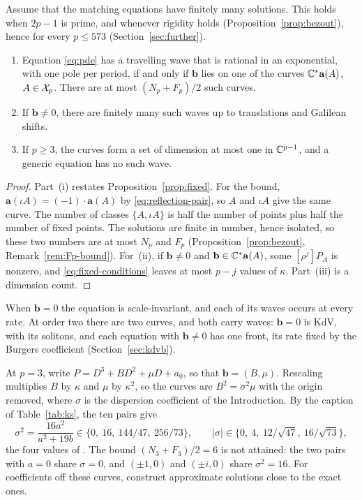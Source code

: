 \begin{corollary}\label{cor:solvable}
Assume that the matching equations have finitely many solutions. This
holds when \(2p-1\) is prime, and whenever rigidity holds
(Proposition~\ref{prop:bezout}), hence for every \(p\le573\)
(Section~\ref{sec:further}).
\begin{enumerate}
\item[\textup{(i)}] Equation \eqref{eq:pde} has a travelling wave that
is rational in an exponential, with one pole per period, if and only if
\(\mathbf b\) lies on one of the curves \(\mathbb C^\ast\mathbf a(A)\),
\(A\in\mathcal X_p\). There are at most \((N_p+F_p)/2\) such curves.
\item[\textup{(ii)}] If \(\mathbf b\ne0\), there are finitely many such
waves up to translations and Galilean shifts.
\item[\textup{(iii)}] If \(p\ge3\), the curves form a set of dimension
at most one in \(\mathbb C^{p-1}\), and a generic equation has no such wave.
\end{enumerate}
\end{corollary}

\begin{proof}
Part~(i) restates Proposition~\ref{prop:fixed}. For the bound,
\(\mathbf a(\iota A)=(-1)\cdot\mathbf a(A)\) by
\eqref{eq:reflection-pair}, so \(A\) and \(\iota A\) give the same
curve. The number of classes \(\{A,\iota A\}\) is half the number of
points plus half the number of fixed points. The solutions are finite in
number, hence isolated, so these two numbers are at most \(N_p\) and
\(F_p\) (Proposition~\ref{prop:bezout}, Remark~\ref{rem:Fp-bound}).
For~(ii), if \(\mathbf b\ne0\) and \(\mathbf b\in\mathbb C^\ast\mathbf a(A)\),
some \([\rho^j]P_A\) is nonzero, and \eqref{eq:fixed-conditions} leaves
at most \(p-j\) values of \(\kappa\). Part~(iii) is a dimension count.
\end{proof}

When \(\mathbf b=0\) the equation is scale-invariant, and each of its
waves occurs at every rate. At order two there are two curves, and both
carry waves: \(\mathbf b=0\) is KdV, with its solitons, and each
equation with \(\mathbf b\ne0\) has one front, its rate fixed by the
Burgers coefficient (Section~\ref{sec:kdvb}).

At \(p=3\), write \(P=D^3+BD^2+\mu D+a_0\), so that
\(\mathbf b=(B,\mu)\). Rescaling multiplies \(B\) by \(\kappa\) and
\(\mu\) by \(\kappa^2\), so the curves are \(B^2=\sigma^2\mu\) with the
origin removed, where \(\sigma\) is the dispersion coefficient of the
Introduction. By the caption of Table~\ref{tab:ks}, the ten pairs give
\begin{equation}\label{eq:ks-sigma}
 \sigma^2=\frac{16a^2}{a^2+19b}\in\{0,\ 16,\ 144/47,\ 256/73\},\qquad
 |\sigma|\in\{0,\ 4,\ 12/\sqrt{47},\ 16/\sqrt{73}\},
\end{equation}
the four values of \citet[Eq.~(39)]{Kudryashov1989}. The bound
\((N_3+F_3)/2=6\) is not attained: the two pairs with \(a=0\) share
\(\sigma=0\), and \((\pm1,0)\) and \((\pm i,0)\) share \(\sigma^2=16\).
For coefficients off these curves, \citet{KudryashovKochanov2012}
construct approximate solutions close to the exact ones.

